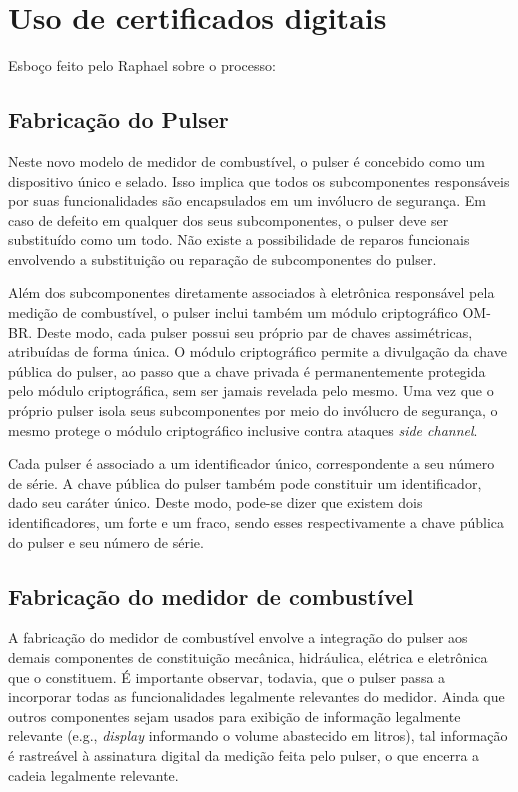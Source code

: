 \documentclass[12pt]{article}
\begin{document}
\section{Uso de certificados digitais}
Esboço feito pelo Raphael sobre o processo:

\subsection{Fabricação do Pulser}
Neste novo modelo de medidor de combustível, o pulser é concebido como um dispositivo único e selado.
Isso implica que todos os subcomponentes responsáveis por suas funcionalidades são encapsulados em um invólucro de segurança.
Em caso de defeito em qualquer dos seus subcomponentes, o pulser deve ser substituído como um todo.
Não existe a possibilidade de reparos funcionais envolvendo a substituição ou reparação de subcomponentes do pulser.

Além dos subcomponentes diretamente associados à eletrônica responsável pela medição de combustível, o pulser inclui também um módulo criptográfico OM-BR.
Deste modo, cada pulser possui seu próprio par de chaves assimétricas, atribuídas de forma única.
O módulo criptográfico permite a divulgação da chave pública do pulser, ao passo que a chave privada é permanentemente protegida pelo módulo criptográfica, sem ser jamais revelada pelo mesmo.
Uma vez que o próprio pulser isola seus subcomponentes por meio do invólucro de segurança, o mesmo protege o módulo criptográfico inclusive contra ataques \textit{side channel}.

Cada pulser é associado a um identificador único, correspondente a seu número de série.
A chave pública do pulser também pode constituir um identificador, dado seu caráter único.
Deste modo, pode-se dizer que existem dois identificadores, um forte e um fraco, sendo esses respectivamente a chave pública do pulser e seu número de série.

\subsection{Fabricação do medidor de combustível}
A fabricação do medidor de combustível envolve a integração do pulser aos demais componentes de constituição mecânica, hidráulica, elétrica e eletrônica que o constituem.
É importante observar, todavia, que o pulser passa a incorporar todas as funcionalidades legalmente relevantes do medidor.
Ainda que outros componentes sejam usados para exibição de informação legalmente relevante (e.g., \textit{display} informando o volume abastecido em litros), tal informação é rastreável à assinatura digital da medição feita pelo pulser, o que encerra a cadeia legalmente relevante.
\end{document}

